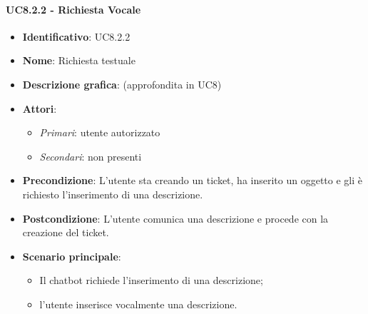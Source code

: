   \paragraph{UC8.2.2 - Richiesta Vocale}
  \begin{itemize}
     \item \textbf{Identificativo}: UC8.2.2
     \item \textbf{Nome}: Richiesta testuale
     \item \textbf{Descrizione grafica}: (approfondita in UC8)
     \item \textbf{Attori}:
     \begin{itemize} 
         \item \textit{Primari}: utente autorizzato
         \item \textit{Secondari}: non presenti
     \end{itemize}
         \item \textbf{Precondizione}: L'utente sta creando un ticket, ha inserito un oggetto e gli è richiesto l'inserimento di una descrizione.
         \item \textbf{Postcondizione}: L'utente comunica una descrizione e procede con la creazione del ticket. 
      \item \textbf{Scenario principale}: 
         \begin{itemize}  
          \item Il chatbot richiede l'inserimento di una descrizione;
          \item l'utente inserisce vocalmente una descrizione.
         \end{itemize}
  \end{itemize}



